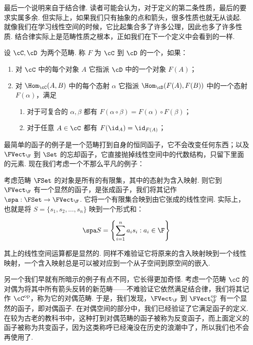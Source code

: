 最后一个说明来自于结合律. 读者可能会认为，对于定义的第二条性质，最后的要求实属多余. 但实际上，如果我们只有抽象的点和箭头，很多性质也就无从谈起. 就像我们在学习线性空间的时候，它比起集合多了许多公理，因此也多了许多性质. 结合律实际上是范畴性质之根本，正如我们在下一个定义中会看到的一样.

\begin{definition}{}{}
    设 $\cC, \cD$ 为两个范畴. 称 $F$ 为 $\cC$ 到 $\cD$ 的一个，如果：
    \begin{enumerate}
        \item 对 $\cC$ 中的每个对象 $A$ 它指派 $\cD$ 中的一个对象 $F(A)$；
        \item 对 $\Hom_\cC (A, B)$ 中的每个态射 $\alpha$ 它指派 $\Hom_\cD (F(A), F(B))$ 中的一个态射 $F(\alpha)$，满足
              \begin{enumerate}
                  \item 对于可复合的 $\alpha, \beta$ 都有 $F(\alpha \circ \beta) = F(\alpha) \circ F(\beta)$；
                  \item 对于任意 $A \in \cC$ 都有 $F(\id_A) = \id_{F(A)}$；
              \end{enumerate}
    \end{enumerate}
\end{definition}

最简单的函子的例子是一个范畴打到自身的恒同函子，它不会改变任何东西；以及 $\FVect_\F$ 到 $\Set$ 的忘却函子，它直接抛掉线性空间中的代数结构，只留下里面的元素. 现在我们考虑一个不那么平凡的例子：

\begin{example}{}{}
    考虑范畴 $\FSet$ 的对象是所有的有限集，其中的态射为含入映射. 则它到 $\FVect_\F$ 有一个显然的函子，是张成函子，我们将其记作 $\spa: \FSet \to \FVect_\F$. 它将一个有限集合映到由它张成的线性空间. 实际上，也就是将 $S = \{s_1, s_2,\ldots, s_n\}$ 映到一个形式和：

    \[
        \spa S = \left\{\sum_{i = 1}^n a_i s_i: a_i \in \F\right\}
    \]

    其上的线性空间运算都是显然的. 同样不难验证它将原来的含入映射映到一个线性映射，一个含入映射总是可以被对应到一个从子空间到原空间的嵌入.
\end{example}

另一个我们早就有所暗示的例子有点不同，它长得更加奇怪. 考虑一个范畴 $\cC$ 的对偶为将其中所有箭头反转的新范畴——不难验证它依然满足结合律，我们将其记作 $\cC^\mathrm{op}$，称为它的对偶范畴. 于是，我们发现，$\FVect_\F$ 到 $\FVect_\F^\mathrm{op}$ 有一个显然的函子，即对偶函子. 在对偶空间的部分中，我们已经验证了它满足函子的定义. 在较为古老的教科书中，这种打到对偶范畴的函子被称为反变函子，而上面定义的函子被称为共变函子，因为这类称呼已经淹没在历史的浪潮中了，所以我们也不会再使用了.

